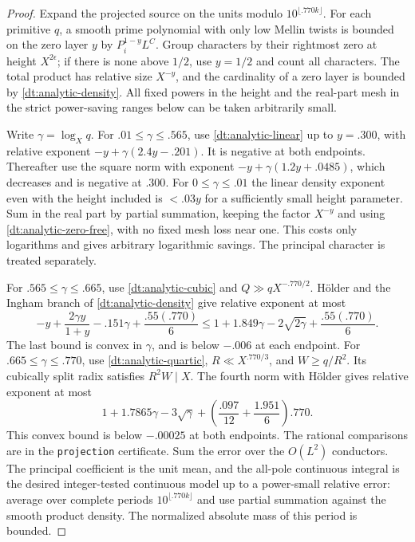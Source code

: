 \documentclass[11pt,a4paper]{article}
\theoremstyle{paperplain}
\numberwithin{equation}{section}
\begin{document}
\begin{proof}
Expand the projected source on the units modulo \(10^{\lfloor .770k\rfloor}\).
For each primitive \(q\), a smooth prime polynomial with only low Mellin
twists is bounded on the zero layer \(y\) by \(P_i^{1-y}L^C\).
Group characters by their rightmost zero at height \(X^{2\epsilon}\);
if there is none above \(1/2\), use \(y=1/2\) and count all characters.
The total product has relative size \(X^{-y}\), and the cardinality
of a zero layer is bounded by \eqref{dt:analytic-density}.
All fixed powers in the height and the real-part mesh in the strict
power-saving ranges below can be taken arbitrarily small.

Write \(\gamma=\log_X q\). For \(.01\le\gamma\le.565\), use
\eqref{dt:analytic-linear} up to \(y=.300\), with relative exponent
\(-y+\gamma(2.4y-.201)\). It is negative at both endpoints. Thereafter
use the square norm with exponent \(-y+\gamma(1.2y+.0485)\),
which decreases and is negative at \(.300\).
For \(0\le\gamma\le.01\) the linear density exponent even with the
height included is \(<.03 y\) for a sufficiently small height parameter.
Sum in the real part by partial summation, keeping the factor
\(X^{-y}\) and using \eqref{dt:analytic-zero-free}, with no fixed
mesh loss near one. This costs only logarithms and gives arbitrary
logarithmic savings. The principal character is treated separately.

For \(.565\le\gamma\le.665\), use \eqref{dt:analytic-cubic} and
\(Q\gg qX^{-.770/2}\). Hölder and the Ingham branch of
\eqref{dt:analytic-density} give relative exponent at most
\[
 -y+\frac{2\gamma y}{1+y}-.151\gamma+\frac{.55(.770)}6
 \le 1+1.849\gamma-2\sqrt{2\gamma}+\frac{.55(.770)}6.
\]
The last bound is convex in \(\gamma\), and is below \(-.006\)
at each endpoint. For \(.665\le\gamma\le.770\), use
\eqref{dt:analytic-quartic}, \(R\ll X^{.770/3}\), and
\(W\ge q/R^2\). Its cubically split radix satisfies \(R^2W\mid X\).
The fourth norm with Hölder gives relative exponent at most
\[
 1+1.7865\gamma-3\sqrt\gamma+
 \left(\frac{.097}{12}+\frac{1.951}{6}\right).770 .
\]
This convex bound is below \(-.00025\) at both endpoints. The rational
comparisons are in the \texttt{projection} certificate. Sum the
error over the \(O(L^2)\) conductors. The principal coefficient is the
unit mean, and the all-pole continuous integral is the desired
integer-tested continuous model up to a power-small relative error:
average over complete periods \(10^{\lfloor .770k\rfloor}\) and
use partial summation against the smooth product density. The normalized
absolute mass of this period is bounded.
\end{proof}
\end{document}
